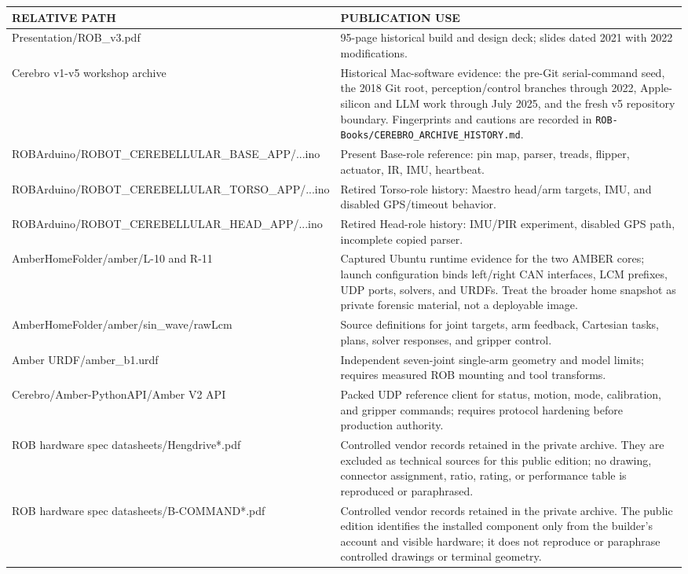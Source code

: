 \documentclass[10pt,openany]{book}
\begin{document}
\begin{tabularx}{\textwidth}{>{\ttfamily\scriptsize}p{2.65in} X}
\toprule
RELATIVE PATH & PUBLICATION USE\\
\midrule
Presentation/ROB\_v3.pdf & 95-page historical build and design deck; slides dated 2021 with 2022 modifications.\\
Cerebro v1-v5 workshop archive & Historical Mac-software evidence: the pre-Git serial-command seed, the 2018 Git root, perception/control branches through 2022, Apple-silicon and LLM work through July 2025, and the fresh v5 repository boundary. Fingerprints and cautions are recorded in \texttt{ROB-Books/CEREBRO\_ARCHIVE\_HISTORY.md}.\\
ROBArduino/ROBOT\_CEREBELLULAR\_BASE\_APP/...ino & Present Base-role reference: pin map, parser, treads, flipper, actuator, IR, IMU, heartbeat.\\
ROBArduino/ROBOT\_CEREBELLULAR\_TORSO\_APP/...ino & Retired Torso-role history: Maestro head/arm targets, IMU, and disabled GPS/timeout behavior.\\
ROBArduino/ROBOT\_CEREBELLULAR\_HEAD\_APP/...ino & Retired Head-role history: IMU/PIR experiment, disabled GPS path, incomplete copied parser.\\
AmberHomeFolder/amber/L-10 and R-11 & Captured Ubuntu runtime evidence for the two AMBER cores; launch configuration binds left/right CAN interfaces, LCM prefixes, UDP ports, solvers, and URDFs. Treat the broader home snapshot as private forensic material, not a deployable image.\\
AmberHomeFolder/amber/sin\_wave/rawLcm & Source definitions for joint targets, arm feedback, Cartesian tasks, plans, solver responses, and gripper control.\\
Amber URDF/amber\_b1.urdf & Independent seven-joint single-arm geometry and model limits; requires measured ROB mounting and tool transforms.\\
Cerebro/Amber-PythonAPI/Amber V2 API & Packed UDP reference client for status, motion, mode, calibration, and gripper commands; requires protocol hardening before production authority.\\
ROB hardware spec datasheets/Hengdrive*.pdf & Controlled vendor records retained in the private archive. They are excluded as technical sources for this public edition; no drawing, connector assignment, ratio, rating, or performance table is reproduced or paraphrased.\\
ROB hardware spec datasheets/B-COMMAND*.pdf & Controlled vendor records retained in the private archive. The public edition identifies the installed component only from the builder's account and visible hardware; it does not reproduce or paraphrase controlled drawings or terminal geometry.\\

\end{tabularx}
\end{document}
